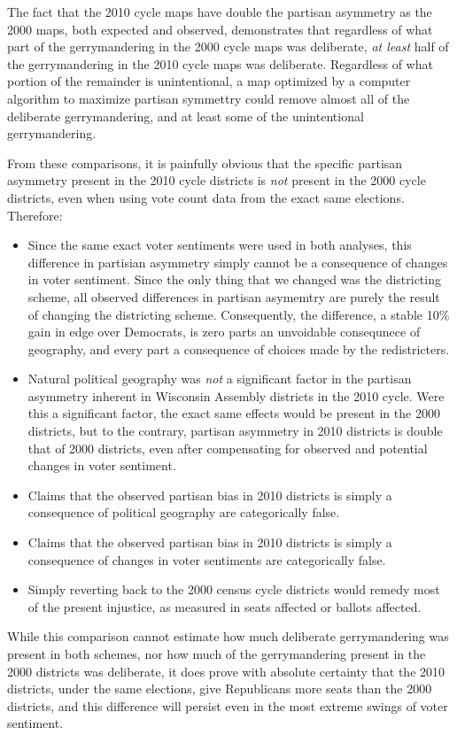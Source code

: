 \documentclass[preprint,12pt]{article}
\begin{document}
The fact that the 2010 cycle maps have double the partisan asymmetry as the 2000 maps, both expected and observed, demonstrates that regardless of what part of the gerrymandering in the 2000 cycle maps was deliberate, \emph{at least} half of the gerrymandering in the 2010 cycle maps was deliberate.
Regardless of what portion of the remainder is unintentional, a map optimized by a computer algorithm to maximize partisan symmettry could remove almost all of the deliberate gerrymandering, and at least some of the unintentional gerrymandering.

From these comparisons, it is painfully obvious that the specific partisan asymmetry present in the 2010 cycle districts is \emph{not} present in the 2000 cycle districts, even when using vote count data from the exact same elections.  Therefore:
\begin{itemize}
\item Since the same exact voter sentiments were used in both analyses, this difference in partisian asymmetry simply cannot be a consequence of changes in voter sentiment.  
Since the only thing that we changed was the districting scheme, all observed differences in partisan asymemtry are purely the result of changing the districting scheme.
Consequently, the difference, a stable 10\% gain in edge over Democrats, is zero parts an unvoidable consequnece of geography, and every part a consequence of choices made by the redistricters.
\item Natural political geography was \emph{not} a significant factor in the partisan asymmetry inherent in Wisconsin Assembly districts in the 2010 cycle.  
Were this a significant factor, the exact same effects would be present in the 2000 districts, but to the contrary, partisan asymmetry in 2010 districts is double that of 2000 districts, even after compensating for observed and potential changes in voter sentiment.
\item Claims that the observed partisan bias in 2010 districts is simply a consequence of political geography are categorically false.
\item Claims that the observed partisan bias in 2010 districts is simply a consequence of changes in voter sentiments are categorically false.
\item Simply reverting back to the 2000 census cycle districts would remedy most of the present injustice, as measured in seats affected or ballots affected.
\end{itemize}

While this comparison cannot estimate how much deliberate gerrymandering was present in both schemes, 
nor how much of the gerrymandering present in the 2000 districts was deliberate, 
it does prove with absolute certainty that the 2010 districts, under the same elections, give Republicans more seats than the 2000 districts, and this difference will persist even in the most extreme swings of voter sentiment.
\end{document}
